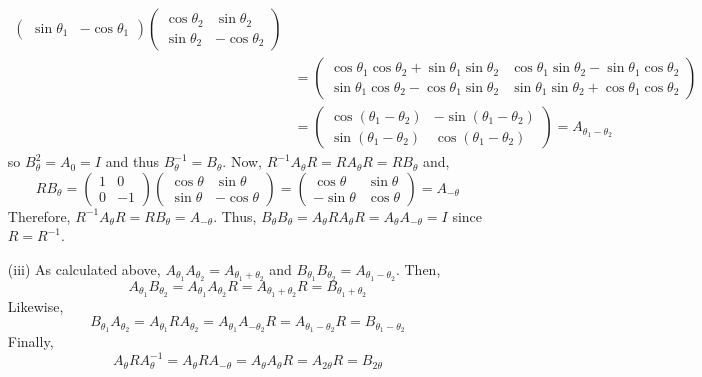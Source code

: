 \documentclass[12pt]{extarticle}
\begin{document}
\begin{enumerate}
\begin{align*}
\begin{pmatrix}
\sin{\theta_1} & -\cos{\theta_1}
\end{pmatrix}
\begin{pmatrix}
\cos{\theta_2} & \sin{\theta_2} \\
\sin{\theta_2} & -\cos{\theta_2}
\end{pmatrix} 
\\
& = 
\begin{pmatrix}
\cos{\theta_1} \cos{\theta_2} + \sin{\theta_1} \sin{\theta_2} &  \cos{\theta_1} \sin{\theta_2} - \sin{\theta_1} \cos{\theta_2}
\\
\sin{\theta_1} \cos{\theta_2} - \cos{\theta_1} \sin{\theta_2} &  \sin{\theta_1} \sin{\theta_2} + \cos{\theta_1} \cos{\theta_2} 
\end{pmatrix}
\\
& = 
\begin{pmatrix}
\cos{(\theta_1 - \theta_2)} & - \sin{(\theta_1 - \theta_2)} \\
\sin{(\theta_1 - \theta_2)} & \cos{(\theta_1 - \theta_2)}
\end{pmatrix}
= A_{\theta_1 - \theta_2}
\end{align*}
so $B_{\theta}^2 = A_{0} = I$ and thus $B_{\theta}^{-1} = B_{\theta}$. Now, $R^{-1} A_{\theta} R = R A_{\theta} R = R B_{\theta}$ and,
\[ R B_\theta = 
\begin{pmatrix}
1 & 0 \\
0 & -1
\end{pmatrix} 
\begin{pmatrix}
\cos{\theta} & \sin{\theta}\\
\sin{\theta} & -\cos{\theta}
\end{pmatrix} 
=
\begin{pmatrix}
\cos{\theta} &  \sin{\theta}\\
-\sin{\theta} &  \cos{\theta}
\end{pmatrix} 
= A_{-\theta}
\] 
Therefore, $R^{-1} A_{\theta} R = R B_{\theta} = A_{-\theta}$. Thus,
$B_{\theta} B_{\theta} = A_{\theta} R A_{\theta} R = A_{\theta} A_{- \theta} = I$ since $R = R^{-1}$.  
\item[(iii)]
As calculated above, $A_{\theta_1} A_{\theta_2} = A_{\theta_1 + \theta_2}$ and $B_{\theta_1} B_{\theta_2} = A_{\theta_1 - \theta_2}$. Then,
\[A_{\theta_1} B_{\theta_2} = A_{\theta_1} A_{\theta_2} R = A_{\theta_1 + \theta_2} R = B_{\theta_1 + \theta_2}\]
Likewise,
\[B_{\theta_1} A_{\theta_2} = A_{\theta_1} R A_{\theta_2} = A_{ \theta_1} A_{-\theta_2} R =  A_{\theta_1 - \theta_2} R = B_{\theta_1 - \theta_2}\]
Finally, 
\[A_{\theta} R A_{\theta}^{-1} = A_{\theta} R A_{-\theta} = A_{\theta} A_{\theta} R = A_{2 \theta} R = B_{2 \theta}\] 


\end{enumerate}
\end{document}
